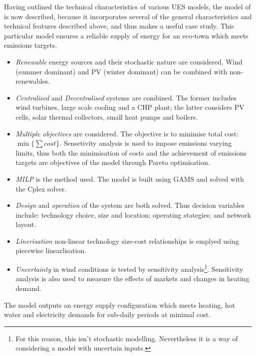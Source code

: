 Having outlined the technical characteristics of various UES models, the model of \citet{Weber2011} is now described, because it incorporates several of the general characteristics and technical features described above, and thus makes a useful case study. This particular model ensures a reliable supply of energy for an eco-town which meets emissions targets.
\begin{itemize}
	\item \emph{Renewable} energy sources and their stochastic nature are considered. Wind (summer dominant) and PV (winter dominant) can be combined with non-renewables.
	\item \emph{Centralised} and \emph{Decentralised} systems are combined. The former includes wind turbines, large scale cooling and a CHP plant; the latter considers PV cells, solar thermal  collectors, small heat pumps and boilers.
	\item \emph{Multiple objectives} are considered. The objective is to minimise total cost:  $\min\{\sum cost\}$. Sensetivity analysis is used to impose emissions varying limits, thus both the minimisation of costs and the achievement of emissions targets are objectives of the model through Pareto optimisation.
	\item \emph{MILP} is the method used. The model is built using GAMS and solved with the Cplex solver.
	\item \emph{Design} and \emph{operation} of the system are both solved. Thus decision variables include: technology choice, size and location; operating stategies; and network layout.
	\item \emph{Linerisation} non-linear technology size-cost relationships is emplyed using piecewise linearlisation.
	\item \emph{Uncertainty} in wind conditions is tested by sensitivity analysis\footnote{For this reason, this isn't stochastic modelling. Nevertheless it is a way of considering a model with uncertain inputs.}. Sensitivity analysis is also used to measure the effects of markets and changes in heating demand.
\end{itemize}
The model outputs an energy supply configuration which meets heating, hot water and electricity demands for sub-daily periods at minimal cost.

